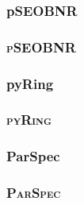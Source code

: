 \documentclass[CJK,aspectratio=169]{beamer}  %
\begin{document}
\subsubsection{pSEOBNR}
\begin{frame}[allowframebreaks]
	\frametitle{\textsc{pSEOBNR}}
	\par \cite{pPMR}
\end{frame}

\subsubsection{pyRing}
\begin{frame}[allowframebreaks]
	\frametitle{\textsc{pyRing}}
\end{frame}

\subsubsection{ParSpec}
\begin{frame}[allowframebreaks]
	\frametitle{\textsc{ParSpec}}
	
\end{frame}
\end{document}
